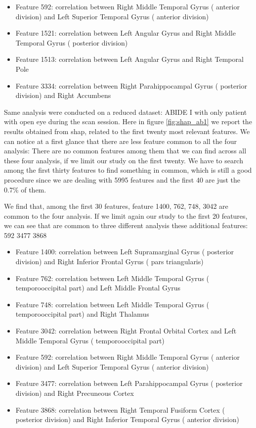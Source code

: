 \documentclass[a4paper,11pt]{article}
\begin{document}
\begin{itemize}
\item Feature 592: correlation between Right Middle Temporal Gyrus ( anterior division) and Left Superior Temporal Gyrus ( anterior division)
\item Feature 1521: correlation between Left Angular Gyrus  and Right Middle Temporal Gyrus ( posterior division)
\item Feature 1513: correlation between Left Angular Gyrus  and Right Temporal Pole
\item Feature 3334: correlation between Right Parahippocampal Gyrus ( posterior division) and Right Accumbens
\end{itemize}

Same analysis were conducted on a reduced dataset: ABIDE I with only patient with open eye during the scan session. Here in figure \ref{fig:shap_ab1} we report the results obtained from shap, related to the first twenty most relevant features.
We can notice at a first glance that there are less feature common to all the four analysis:
There are no common features among them that we can find across all these four analysis, if we limit our study on the first twenty.
We have to search among the first thirty features to find something in common, which is still a good procedure since we are dealing with 5995 features and the first 40 are just the 0.7\% of them.

We find that, among the first 30 features, feature 1400, 762, 748, 3042 are common to the four analysis.
If we limit again our study to the first 20 features, we can see that are common to three different analysis these additional features: 592 3477 3868




\begin{itemize}
\item Feature 1400: correlation between Left Supramarginal Gyrus ( posterior division) and Right Inferior Frontal Gyrus ( pars triangularis)
\item Feature 762: correlation between Left Middle Temporal Gyrus ( temporooccipital part) and Left Middle Frontal Gyrus
\item Feature 748: correlation between Left Middle Temporal Gyrus ( temporooccipital part) and Right Thalamus
\item Feature 3042: correlation between Right Frontal Orbital Cortex  and Left Middle Temporal Gyrus ( temporooccipital part)

\item Feature 592: correlation between Right Middle Temporal Gyrus ( anterior division) and Left Superior Temporal Gyrus ( anterior division)
\item Feature 3477: correlation between Left Parahippocampal Gyrus ( posterior division) and Right Precuneous Cortex
\item Feature 3868: correlation between Right Temporal Fusiform Cortex ( posterior division) and Right Inferior Temporal Gyrus ( anterior division)

\end{itemize}
\end{document}
